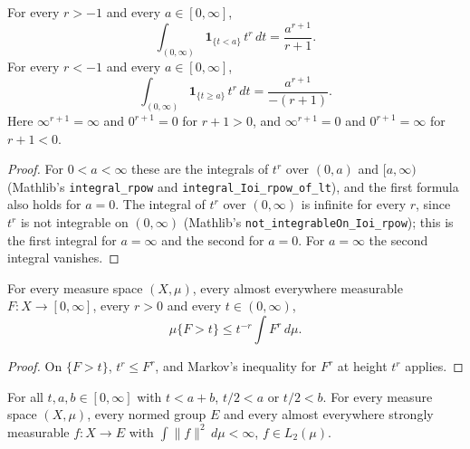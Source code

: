 \begin{lemma}
\label{lem:power-integrals}
\leanok
For every $r > -1$ and every $a \in [0, \infty]$,
\[
  \int_{(0, \infty)} \mathbf 1_{\{t < a\}} \, t^r \, dt = \frac{a^{r+1}}{r + 1} .
\]
For every $r < -1$ and every $a \in [0, \infty]$,
\[
  \int_{(0, \infty)} \mathbf 1_{\{t \geq a\}} \, t^r \, dt = \frac{a^{r+1}}{-(r + 1)} .
\]
Here $\infty^{r+1} = \infty$ and $0^{r+1} = 0$ for $r + 1 > 0$, and $\infty^{r+1} = 0$ and
$0^{r+1} = \infty$ for $r + 1 < 0$.
\end{lemma}

\begin{proof}
\leanok
For $0 < a < \infty$ these are the integrals of $t^r$ over $(0, a)$ and $[a, \infty)$ (Mathlib's
\texttt{integral\_rpow} and \texttt{integral\_Ioi\_rpow\_of\_lt}), and the first formula also
holds for $a = 0$. The integral of $t^r$ over $(0, \infty)$ is infinite for every $r$, since
$t^r$ is not integrable on $(0, \infty)$ (Mathlib's \texttt{not\_integrableOn\_Ioi\_rpow}); this
is the first integral for $a = \infty$ and the second for $a = 0$. For $a = \infty$ the second
integral vanishes.
\end{proof}

\begin{lemma}
\label{lem:chebyshev-power}
\leanok
For every measure space $(X, \mu)$, every almost everywhere measurable $F : X \to [0, \infty]$,
every $r > 0$ and every $t \in (0, \infty)$,
\[
  \mu\{F > t\} \leq t^{-r} \int F^r \, d\mu .
\]
\end{lemma}

\begin{proof}
\leanok
On $\{F > t\}$, $t^r \leq F^r$, and Markov's inequality for $F^r$ at height $t^r$ applies.
\end{proof}

\begin{lemma}
\label{lem:weak-type-elementary}
\leanok
For all $t, a, b \in [0, \infty]$ with $t < a + b$, $t/2 < a$ or $t/2 < b$. For every measure
space $(X, \mu)$, every normed group $E$ and every almost everywhere strongly measurable
$f : X \to E$ with $\int \|f\|^2 \, d\mu < \infty$, $f \in L_2(\mu)$.
\end{lemma}

